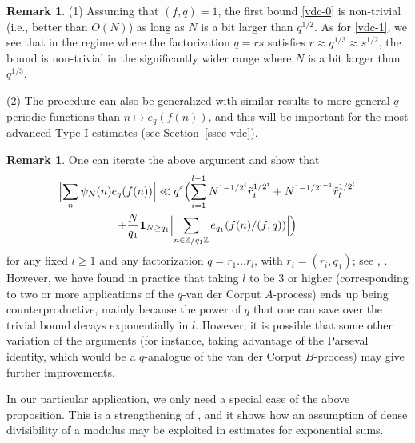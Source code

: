 \documentclass[12pt,a4paper,reqno]{amsart}
\numberwithin{equation}{section}
\theoremstyle{plain}
\theoremstyle{definition}
\newtheorem{remark}[theorem]{Remark}
\newcommand\Z{\mathbb{Z}}
\newcommand\eps{\varepsilon}
\newcommand{\onef}{\mathbf{1}}
\begin{document}
\begin{remark} 
(1) Assuming that $(f,q)=1$, the first bound \eqref{vdc-0}
  is non-trivial (i.e., better than $O(N)$) as long as $N$ is a bit
  larger than $q^{1/2}$. As for \eqref{vdc-1}, we see that in the
  regime where the factorization $q=rs$ satisfies $r\approx
  q^{1/3}\approx s^{1/2}$, the bound is non-trivial in the
  significantly wider range where $N$ is a bit larger than $q^{1/3}$.
\par
(2) The procedure can also be generalized with similar results to more
general $q$-periodic functions than $n\mapsto e_q(f(n))$, and this
will be important for the most advanced Type I estimates (see
Section~\ref{ssec-vdc}). 
\end{remark}

\begin{remark}\label{vdCiterate} One can iterate the above argument
  and show that
\begin{multline*}
  \Bigl|\sum_n \psi_N(n) e_q(f(n)) \Bigr| \ll q^{\eps}\Bigl(
  \sum_{i=1}^{l-1} N^{1-1/2^i} \tilde{r}_i^{1/2^i} +
  N^{1-1/2^{l-1}} \tilde{r}_l^{1/2^l} \\
  + \frac{N}{q_1} \onef_{N \geq q_1} \Bigl|\sum_{n \in \Z/q_1\Z}
    e_{q_1}(f(n) / (f,q) )\Bigr|\Bigr)
\end{multline*}
for any fixed $l \geq 1$ and any factorization $q = r_1 \ldots r_l$,
with $\tilde{r}_i = (r_i,q_1)$; see \cite{graham}, \cite{hb-large}.  However,
we have found in practice that taking $l$ to be $3$ or higher
(corresponding to two or more applications of the $q$-van der Corput
$A$-process) ends up being counterproductive, mainly because the power
of $q$ that one can save over the trivial bound decays exponentially
in $l$.  However, it is possible that some other variation of the
arguments (for instance, taking advantage of the Parseval identity,
which would be a $q$-analogue of the van der Corput $B$-process) may
give further improvements.
\end{remark}

In our particular application, we only need a special case of the
above proposition. This is a strengthening of \cite[Lemma 11]{zhang},
and it shows how an assumption of dense divisibility of a modulus may
be exploited in estimates for exponential sums.
\end{document}
